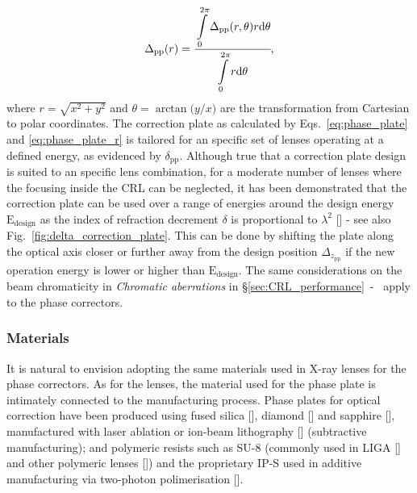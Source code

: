 \begin{refsection}
\begin{equation}\label{eq:phase_plate_r}
   \Delta_\text{pp}(r)=\cfrac{\displaystyle\int\limits_{0}^{2\pi}{\Delta_\text{pp}(r,\theta)r\text{d}\theta}}{\displaystyle\int\limits_{0}^{2\pi}{r\text{d}\theta}},
\end{equation}
where $r=\sqrt{x^2 + y^2}$ and $\theta=\arctan{\big(y/x\big)}$ are the transformation from Cartesian to polar coordinates. The correction plate as calculated by Eqs.~\ref{eq:phase_plate} and \ref{eq:phase_plate_r} is tailored for an specific set of lenses operating at a defined energy, as evidenced by $\delta_\text{pp}$. Although true that a correction plate design is suited to an specific lens combination, for a moderate number of lenses where the focusing inside the CRL can be neglected, it has been demonstrated that the correction plate can be used over a range of energies around the design energy $\text{E}_\text{design}$ as the index of refraction decrement $\delta$ is proportional to $\lambda^2$ [\cite[\textit{\S6}]{Seiboth2018}] - see also Fig.~\ref{fig:delta_correction_plate}. This can be done by shifting the plate along the optical axis closer or further away from the design position $\Delta_{z_\text{pp}}$ if the new operation energy is lower or higher than $\text{E}_\text{design}$. The same considerations on the beam chromaticity in \textit{Chromatic aberrations} in \S\ref{sec:CRL_performance}~-~\textit{} apply to the phase correctors. 

\subsubsection*{Materials}

It is natural to envision adopting the same materials used in X-ray lenses for the phase correctors. As for the lenses, the material used for the phase plate is intimately connected to the manufacturing process. Phase plates for optical correction have been produced using fused silica [\cite{Seiboth2017}], diamond [\cite{Polikarpov2016, Antipov2020}] and sapphire [\cite{Lin2020}], manufactured with laser ablation or ion-beam lithography [\cite{Medvedskaya2020}] (subtractive manufacturing); and polymeric resists such as SU-8 (commonly used in LIGA [\cite{Nazmov2004}] and other polymeric lenses [\cite{Stohr2015}]) and the proprietary IP-S used in additive manufacturing via two-photon polimerisation [\cite{Petrov2017, Roth2018, Sanli2018, Abrashitova2020,Lin2020}]. 



\end{refsection}
